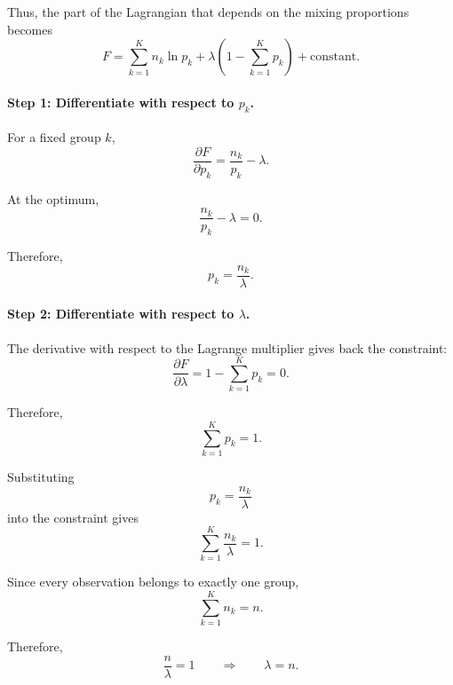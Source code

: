 Thus, the part of the Lagrangian that depends on the mixing
proportions becomes
\begin{equation*}
F
=
\sum_{k=1}^K n_k\ln p_k
+
\lambda
\left(
1-\sum_{k=1}^Kp_k
\right)
+
\text{constant}.
\end{equation*}

\paragraph{Step 1: Differentiate with respect to $p_k$.}

For a fixed group $k$,
\begin{equation*}
\frac{\partial F}{\partial p_k}
=
\frac{n_k}{p_k}-\lambda.
\end{equation*}

At the optimum,
\begin{equation*}
\frac{n_k}{p_k}-\lambda=0.
\end{equation*}

Therefore,
\begin{equation*}
p_k=\frac{n_k}{\lambda}.
\end{equation*}

\paragraph{Step 2: Differentiate with respect to $\lambda$.}

The derivative with respect to the Lagrange multiplier gives back
the constraint:
\begin{equation*}
\frac{\partial F}{\partial\lambda}
=
1-\sum_{k=1}^Kp_k
=
0.
\end{equation*}

Therefore,
\begin{equation*}
\sum_{k=1}^Kp_k=1.
\end{equation*}

Substituting
\begin{equation*}
p_k=\frac{n_k}{\lambda}
\end{equation*}
into the constraint gives
\begin{equation*}
\sum_{k=1}^K\frac{n_k}{\lambda}=1.
\end{equation*}

Since every observation belongs to exactly one group,
\begin{equation*}
\sum_{k=1}^Kn_k=n.
\end{equation*}

Therefore,
\begin{equation*}
\frac{n}{\lambda}=1
\qquad\Longrightarrow\qquad
\lambda=n.
\end{equation*}

